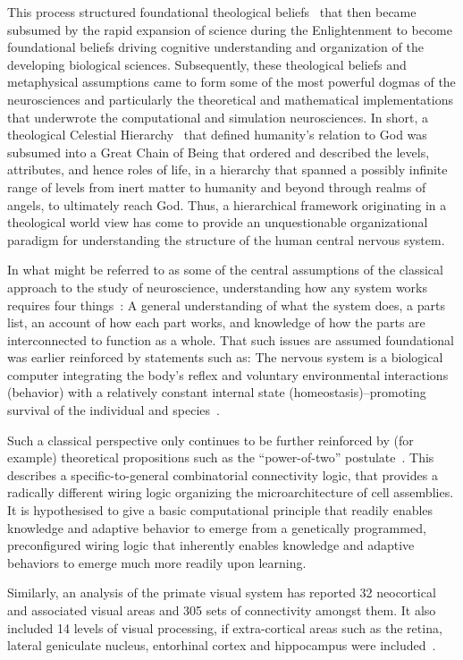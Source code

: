 \documentclass[11pt,3p,twocolumn]{JMN}
\begin{document}
This process structured foundational theological beliefs~\citep{lovejoy48} that then became subsumed by the rapid expansion of science during the Enlightenment to become foundational beliefs driving cognitive understanding and organization of the developing biological sciences. Subsequently, these theological beliefs and metaphysical assumptions came to form some of the most powerful dogmas of the neurosciences and particularly the theoretical and mathematical implementations that underwrote the computational and simulation neurosciences. In short, a theological Celestial Hierarchy~\citep{parker99} that defined humanity's relation to God was subsumed into a Great Chain of Being that ordered and described the levels, attributes, and hence roles of life, in a hierarchy that spanned a possibly infinite range of levels from inert matter to humanity and beyond through realms of angels, to ultimately reach God. Thus, a hierarchical framework originating in a theological world view has come to provide an unquestionable organizational paradigm for understanding the structure of the human central nervous system.

In what might be referred to as some of the central assumptions of the classical approach to the study of neuroscience, understanding how any system works requires four things~\citep{swanson15}: A general understanding of what the system does, a parts list, an account of how each part works, and knowledge of how the parts are interconnected to function as a whole. That such issues are assumed foundational was earlier reinforced by statements such as: The nervous system is a biological computer integrating the body’s reflex and voluntary environmental interactions (behavior) with a relatively constant internal state (homeostasis)--promoting survival of the individual and species~\citep{swanson10}.

Such a classical perspective only continues to be further reinforced by (for example) theoretical propositions such as the ``power-of-two'' postulate~\citep{tsien15}. This describes a specific-to-general combinatorial connectivity logic, that provides a radically different wiring logic organizing the microarchitecture of cell assemblies. It is hypothesised to give a basic computational principle that readily enables knowledge and adaptive behavior to emerge from a genetically programmed, preconfigured wiring logic that inherently enables knowledge and adaptive behaviors to emerge much more readily upon learning.

Similarly, an analysis of the primate visual system has reported 32 neocortical and associated visual areas and 305 sets of connectivity amongst them. It also included 14 levels of visual processing, if extra-cortical areas such as the retina, lateral geniculate nucleus, entorhinal cortex and hippocampus were included~\citep[see Fig.\,4,][]{felleman91}. 
\end{document}
